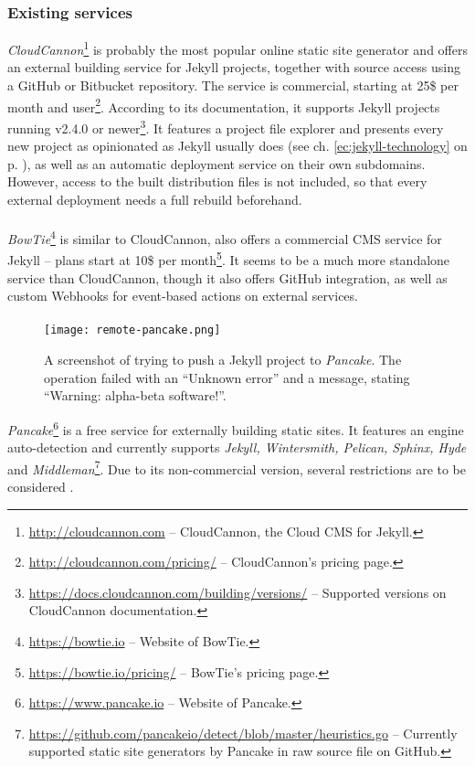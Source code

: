 \subsubsection{Existing services}
\emph{CloudCannon}\footnote{\url{http://cloudcannon.com} -- CloudCannon, the Cloud CMS for Jekyll.} is probably the most popular online static site generator and offers an external building service for Jekyll projects, together with source access using a GitHub or Bitbucket repository. The service is commercial, starting at 25\$ per month and user\footnote{\url{http://cloudcannon.com/pricing/} -- CloudCannon's pricing page.}. According to its documentation, it supports Jekyll projects running v2.4.0 or newer\footnote{\url{https://docs.cloudcannon.com/building/versions/} -- Supported versions on CloudCannon documentation.}. It features a project file explorer and presents every new project as opinionated as Jekyll usually does (see ch. \ref{ec:jekyll-technology} on p. \pageref{ec:jekyll-technology}), as well as an automatic deployment service on their own subdomains. However, access to the built distribution files is not included, so that every external deployment needs a full rebuild beforehand.

\paragraph{}
\emph{BowTie}\footnote{\url{https://bowtie.io} -- Website of BowTie.} is similar to CloudCannon, also offers a commercial CMS service for Jekyll -- plans start at 10\$ per month\footnote{\url{https://bowtie.io/pricing/} -- BowTie's pricing page.}. It seems to be a much more standalone service than CloudCannon, though it also offers GitHub integration, as well as custom Webhooks for event-based actions on external services.

\paragraph{}

\begin{figure} %
    \centering
    \texttt{[image: remote-pancake.png]}
    \caption{A screenshot of trying to push a Jekyll project to \emph{Pancake}. The operation failed with an ``Unknown error'' and a message, stating ``Warning: alpha-beta software!''.}
    \label{fig:remote-pancake}
\end{figure}
%
\emph{Pancake}\footnote{\url{https://www.pancake.io} -- Website of Pancake.} is a free service for externally building static sites. It features an engine auto-detection and currently supports \emph{Jekyll, Wintersmith, Pelican, Sphinx, Hyde} and \emph{Middleman}\footnote{\url{https://github.com/pancakeio/detect/blob/master/heuristics.go} -- Currently supported static site generators by Pancake in raw source file on GitHub.}. Due to its non-commercial version, several restrictions are to be considered \cite{PancakeGitProjects}.

